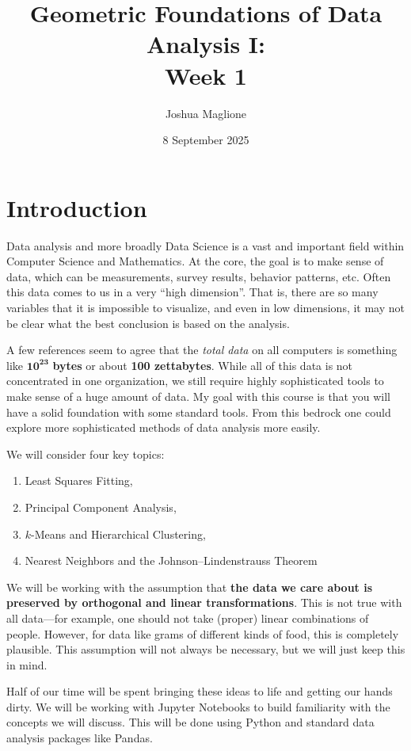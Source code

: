 \documentclass[a4paper, 12pt]{article}
\title{Geometric Foundations of Data Analysis I: \\ Week 1}
\author{Joshua Maglione}
\date{8 September 2025}
\numberwithin{equation}{section}
\numberwithin{figure}{section}
\theoremstyle{definition}
\begin{document}
\maketitle

\section{Introduction}

Data analysis and more broadly Data Science is a vast and important field within
Computer Science and Mathematics. At the core, the goal is to make sense of
data, which can be measurements, survey results, behavior patterns, etc. Often
this data comes to us in a very ``high dimension''. That is, there are so many
variables that it is impossible to visualize, and even in low
dimensions, it may not be clear what the best conclusion is based on the
analysis. 

A few references seem to agree that the \textit{total data} on all computers is
something like $\mathbf{10^{23}}$ \textbf{bytes} or about \textbf{100
zettabytes}. While all of this data is not concentrated in one organization, we
still require highly sophisticated tools to make sense of a huge amount of data.
My goal with this course is that you will have a solid foundation with some
standard tools. From this bedrock one could explore more sophisticated methods
of data analysis more easily. 

\bigskip

\noindent We will consider four key topics:
\begin{enumerate} 
	\item Least Squares Fitting,
	\item Principal Component Analysis,
	\item $k$-Means and Hierarchical Clustering,
	\item Nearest Neighbors and the Johnson--Lindenstrauss Theorem
\end{enumerate}

We will be working with the assumption that \textbf{the data we care about is
preserved by orthogonal and linear transformations}. This is not true with all
data---for example, one should not take (proper) linear combinations of people.
However, for data like grams of different kinds of food, this is completely
plausible. This assumption will not always be necessary, but we will just keep
this in mind. 

Half of our time will be spent bringing these ideas to life and getting our
hands dirty. We will be working with Jupyter Notebooks to build familiarity with
the concepts we will discuss. This will be done using Python and standard data
analysis packages like Pandas. 
\end{document}
